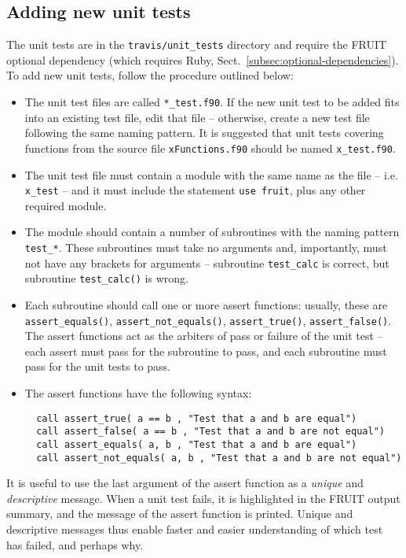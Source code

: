 \subsection{Adding new unit tests} \label{subsec:adding-new-unit-tests}

The unit tests are in the \texttt{travis/unit\_tests} directory and
require the FRUIT optional dependency (which requires Ruby,
Sect.~\ref{subsec:optional-dependencies}). To add new unit tests,
follow the procedure outlined below:

\begin{itemize}
\item The unit test files are called \texttt{*\_test.f90}. If the new
  unit test to be added fits into an existing test file, edit that
  file -- otherwise, create a new test file following the same naming
  pattern. It is suggested that unit tests covering functions from the
  source file \texttt{xFunctions.f90} should be named
  \texttt{x\_test.f90}.
\item The unit test file must contain a module with the same name as
  the file -- i.e. \texttt{x\_test} -- and it must include the
  statement \verb|use fruit|, plus any other required module.
\item The module should contain a number of subroutines with the
  naming pattern \texttt{test\_*}. These subroutines must take no
  arguments and, importantly, must not have any brackets for arguments
  -- subroutine \texttt{test\_calc} is correct, but subroutine
  \texttt{test\_calc()} is wrong.
\item Each subroutine should call one or more assert functions:
  usually, these are \texttt{assert\_equals()}, \texttt{assert\_not\_equals()},
  \texttt{assert\_true()}, \texttt{assert\_false()}. The assert functions
  act as the arbiters of pass or failure of the unit test -- each
  assert must pass for the subroutine to pass, and each subroutine
  must pass for the unit tests to pass.
\item The assert functions have the following syntax:
  \begin{verbatim}
  call assert_true( a == b , "Test that a and b are equal")
  call assert_false( a == b , "Test that a and b are not equal")
  call assert_equals( a, b , "Test that a and b are equal")
  call assert_not_equals( a, b , "Test that a and b are not equal")
  \end{verbatim}
\end{itemize}

It is useful to use the last argument of the assert function as a
\emph{unique} and \emph{descriptive} message. When a unit test fails,
it is highlighted in the FRUIT output summary, and the message of the
assert function is printed. Unique and descriptive messages thus
enable faster and easier understanding of which test has failed, and
perhaps why.

